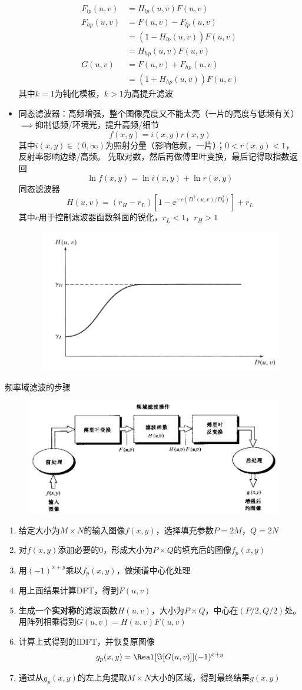 \begin{itemize}
\[\begin{aligned}
F_{lp}(u,v)&=H_{lp}(u,v)F(u,v)\\
F_{hp}(u,v)&=F(u,v)-F_{lp}(u,v)\\
&=(1-H_{lp}(u,v))F(u,v)\\
&=H_{hp}(u,v)F(u,v)\\
G(u,v)&=F(u,v)+F_{hp}(u,v)\\
&=(1+H_{hp}(u,v))F(u,v)
\end{aligned}\]
其中$k=1$为钝化模板，$k>1$为高提升滤波
\item 同态滤波器：高频增强，整个图像亮度又不能太亮（一片的亮度与低频有关）$\implies$抑制低频/环境光，提升高频/细节
\[f(x,y)=i(x,y)r(x,y)\]
其中$i(x,y)\in(0,\infty)$为照射分量（影响低频，一片）；$0<r(x,y)<1$，反射率影响边缘/高频。
先取对数，然后再做傅里叶变换，最后记得取指数返回
\[\ln f(x,y)=\ln i(x,y)+\ln r(x,y)\]
同态滤波器
\[H(u,v)=(r_H-r_L)[1-\ee^{-c(D^2(u,v)/D_0^2)}]+r_L\]
其中$c$用于控制滤波器函数斜面的锐化，$r_L<1$，$r_H>1$
\begin{figure}[H]
\centering
\includegraphics[width=0.4\linewidth]{fig/homo_filter.png}
\end{figure}
\end{itemize}

频率域滤波的步骤
\begin{figure}[H]
\centering
\includegraphics[width=0.6\linewidth]{fig/filter_pass.png}
\end{figure}
\begin{enumerate}
	\item 给定大小为$M\times N$的输入图像$f(x,y)$，选择填充参数$P=2M$，$Q=2N$
	\item 对$f(x,y)$添加必要的0，形成大小为$P\times Q$的填充后的图像$f_p(x,y)$
	\item 用$(-1)^{x+y}$乘以$f_p(x,y)$，做频谱中心化处理
	\item 用上面结果计算DFT，得到$F(u,v)$
	\item 生成一个\textbf{实对称}的滤波函数$H(u,v)$，大小为$P\times Q$，中心在$(P/2,Q/2)$处。
	用阵列相乘得到$G(u,v)=H(u,v)F(u,v)$
	\item 计算上式得到的IDFT，并恢复原图像
	\[g_p(x,y)=\Real[\Im[G(u,v)]](-1)^{x+y}\]
	\item 通过从$g_p(x,y)$的左上角提取$M\times N$大小的区域，得到最终结果$g(x,y)$
\end{enumerate}

